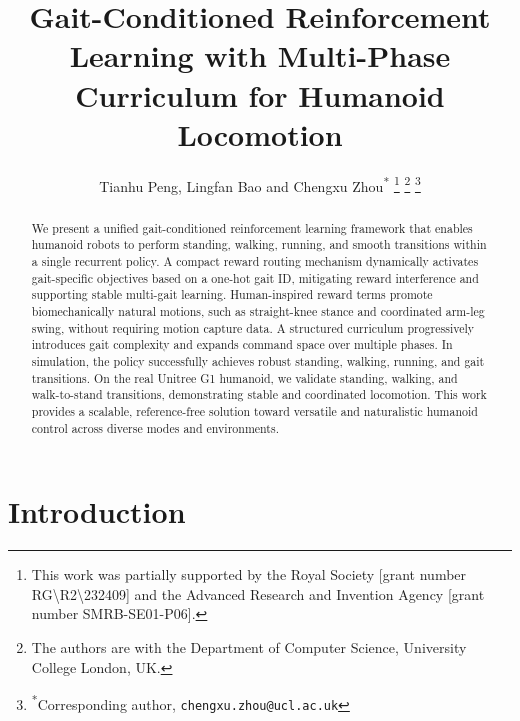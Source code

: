\documentclass[letterpaper, 10 pt, conference]{ieeeconf}
\begin{document}

\title{\LARGE \bf Gait-Conditioned Reinforcement Learning with Multi-Phase Curriculum for Humanoid Locomotion}

\author{
Tianhu Peng, Lingfan Bao and Chengxu Zhou\textsuperscript{*}%
\thanks{This work was partially supported by the Royal Society [grant number RG\textbackslash R2\textbackslash232409] and the Advanced Research and Invention Agency [grant number SMRB-SE01-P06].}%
\thanks{The authors are with the Department of Computer Science, University College London, UK.}%
\thanks{\textsuperscript{*}Corresponding author, {\tt\small chengxu.zhou@ucl.ac.uk}}%
}

\maketitle

\begin{abstract}
We present a unified gait-conditioned reinforcement learning framework that enables humanoid robots to perform standing, walking, running, and smooth transitions within a single recurrent policy. A compact reward routing mechanism dynamically activates gait-specific objectives based on a one-hot gait ID, mitigating reward interference and supporting stable multi-gait learning. Human-inspired reward terms promote biomechanically natural motions, such as straight-knee stance and coordinated arm-leg swing, without requiring motion capture data. A structured curriculum progressively introduces gait complexity and expands command space over multiple phases. In simulation, the policy successfully achieves robust standing, walking, running, and gait transitions. On the real Unitree G1 humanoid, we validate standing, walking, and walk-to-stand transitions, demonstrating stable and coordinated locomotion. This work provides a scalable, reference-free solution toward versatile and naturalistic humanoid control across diverse modes and environments.
\end{abstract}



\section{Introduction}
\end{document}
